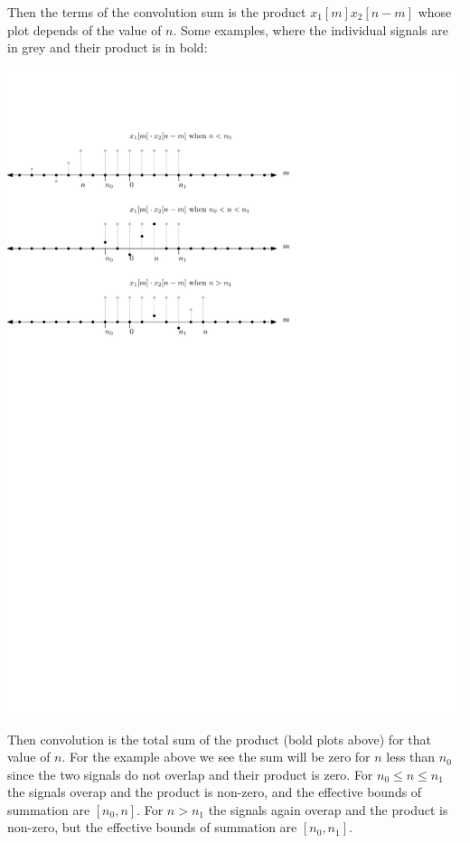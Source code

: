 Then the terms of the convolution sum is the product $x_1[m]x_2[n-m]$ whose plot depends of the value of $n$. Some examples, where the individual signals are in grey and their product is in bold:
\begin{center}
  \includegraphics[scale=1]{graphics/dtconvolution-explain4.pdf}
\end{center}

Then convolution is the total sum of the product (bold plots above) for that value of $n$. For the example above we see the sum will be zero for $n$ less than $n_0$ since the two signals do not overlap and their product is zero. For $n_0 \leq n \leq n_1$ the signals overap and the product is non-zero, and the effective bounds of summation are $[n_0,n]$. For $n > n_1$ the signals again overap and the product is non-zero, but the effective bounds of summation are $[n_0,n_1]$. 

